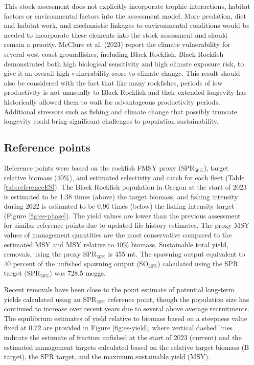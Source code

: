 \documentclass[11pt,
  english,
  letterpaper,
]{article}
\begin{document}
This stock assessment does not explicitly incorporate trophic interactions, habitat factors or environmental factors into the assessment model. More predation, diet and habitat work, and mechanistic linkages to environmental conditions would be needed to incorporate these elements into the stock assessment and should remain a priority. McClure et al. (2023) report the climate vulnerability for several west coast groundfishes, including Black Rockfish. Black Rockfish demonstrated both high biological sensitivity and high climate exposure risk, to give it an overall high vulnerability score to climate change. This result should also be considered with the fact that like many rockfishes, periods of low productivity is not unusually to Black Rockfish and their extended longevity has historically allowed them to wait for advantageous productivity periods. Additional stressors such as fishing and climate change that possibly truncate longevity could bring significant challenges to population sustainability.

\hypertarget{reference-points}{%
\subsection*{Reference points}\label{reference-points}}

Reference points were based on the rockfish FMSY proxy (\(\text{SPR}_{50\%}\)), target relative biomass (40\%), and estimated selectivity and catch for each fleet (Table \ref{tab:referenceES}). The Black Rockfish population in Oregon at the start of 2023 is estimated to be 1.38 times (above) the target biomass, and fishing intensity during 2022 is estiamted to be 0.96 times (below) the fishing intensity target (Figure \ref{fig:es-phase}). The yield values are lower than the previous assessment for similar reference points due to updated life history estimates. The proxy MSY values of management quantities are the most conservative compared to the estimated MSY and MSY relative to 40\% biomass. Sustainable total yield, removals, using the proxy \(\text{SPR}_{50\%}\) is 455 mt. The spawning output equivalent to 40 percent of the unfished spawning output (\(\text{SO}_{40\%}\)) calculated using the SPR target (\(\text{SPR}_{50\%}\)) was 728.5 meggs.

Recent removals have been close to the point estimate of potential long-term yields calculated using an \(\text{SPR}_{50\%}\) reference point, though the population size has continued to increase over recent years due to several above average recruitments. The equilibrium estimates of yield relative to biomass based on a steepness value fixed at 0.72 are provided in Figure \ref{fig:es-yield}, where vertical dashed lines indicate the estimate of fraction unfished at the start of 2023 (current) and the estimated management targets calculated based on the relative target biomass (B target), the SPR target, and the maximum sustainable yield (MSY).
\end{document}
